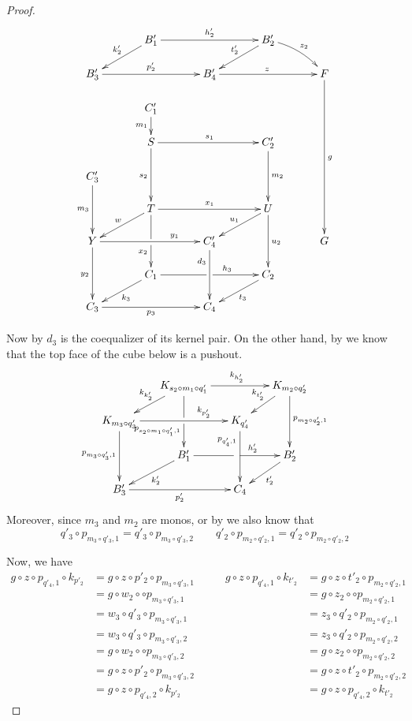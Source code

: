\begin{proof}
\[\xymatrix@C=35pt@R=15pt{& B'_1 \ar[rr]^{h'_2} \ar[dl]_{k'_2} && B'_2 \ar[dl]_{t'_2} \ar@/^.2cm/[dr]^{z_2}\\B'_3 \ar[rr]^{p'_2} && B'_4  \ar[rr]^{z}&& F \ar[ddddd]^{g}\\& C'_1 \ar[d]_{m_1}\\& S \ar[rr]^{s_1} \ar[dd]_{s_2} && C'_2 \ar[dd]^{m_2} \\ C'_3 \ar[dd]_{m_3}\\&T\ar[dd]|\hole_(.65){x_2}\ar[rr]^{x_1} \ar[dl]_{w} && U \ar[dd]^{u_2} \ar[dl]_{u_1} \\ Y  \ar[dd]_{y_2}\ar[rr]^(.7){y_1} & & C'_4 \ar[dd]_(.3){d_3} && G\\&C_1\ar[rr]|\hole^(.65){h_3} \ar[dl]^{k_3} && C_2 \ar[dl]^{t_3} \\C_3 \ar[rr]_{p_3} & & C_4}\]


Now by  $d_3$ is the coequalizer of its kernel pair. On the other hand, by   we know that the top face of the cube below is a pushout.
\[\xymatrix@C=15pt@R=15pt{&K_{s_2\circ m_1\circ q'_1}\ar[dd]|\hole_(.65){p_{s_2\circ m_1\circ q'_1,1}}\ar[rr]^{k_{h'_2}} \ar[dl]_{k_{k'_2}} && K_{m_2\circ q'_2} \ar[dd]^{p_{m_2\circ q'_2,1}} \ar[dl]_{k_{t'_2}} \\ K_{m_3\circ q'_3}  \ar[dd]_{p_{m_3\circ q'_3,1}}\ar[rr]^(.7){k_{p'_2}} & & K_{q'_4} \ar[dd]_(.3){p_{q'_4,1}}\\&B'_1\ar[rr]|\hole^(.65){h'_2} \ar[dl]^{k'_2} && B'_2 \ar[dl]^{t'_2} \\B'_3 \ar[rr]_{p'_2} & & C_4}\]
Moreover, since $m_3$ and $m_2$ are monos, or by  we also know that
\[q'_3\circ p_{m_3\circ q'_3, 1}  = q'_3\circ p_{m_3\circ q'_3,2} \qquad q'_2\circ p_{m_2\circ q'_2, 1}  = q'_2\circ p_{m_2\circ q'_2,2}\]

Now, we have
\[
\begin{split}
	g\circ z\circ p_{q'_4,1} \circ k_{p'_2}&=g\circ z\circ p'_2\circ p_{m_3\circ q'_3, 1}\\&=g\circ w_2\circ \circ  p_{m_3\circ q'_3, 1}\\&=w_3\circ q'_3\circ p_{m_3\circ q'_3, 1}\\&=w_3\circ q'_3\circ p_{m_3\circ q'_3, 2}\\&=g\circ w_2\circ \circ  p_{m_3\circ q'_3, 2}\\&=g\circ z\circ p'_2\circ p_{m_3\circ q'_3, 2}\\&=g\circ z\circ p_{q'_4,2} \circ k_{p'_2}
\end{split} \qquad 
\begin{split}
g\circ z\circ p_{q'_4,1} \circ k_{t'_2}&=g\circ z\circ t'_2\circ p_{m_2\circ q'_2, 1}\\&=g\circ z_2\circ \circ  p_{m_2\circ q'_2, 1}\\&=z_3\circ q'_2\circ p_{m_2\circ q'_2, 1}\\&=z_3\circ q'_2\circ p_{m_2\circ q'_2, 2}\\&=g\circ z_2\circ \circ  p_{m_2\circ q'_2, 2}\\&=g\circ z\circ t'_2\circ p_{m_2\circ q'_2, 2}\\&=g\circ z\circ p_{q'_4,2} \circ k_{t'_2}
\end{split}
\]


\end{proof}
